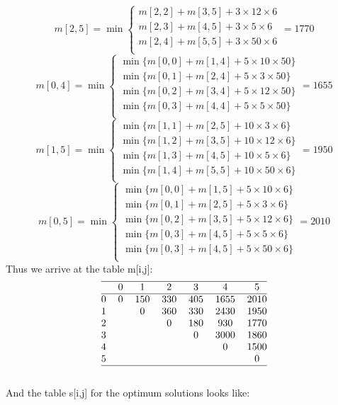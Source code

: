 \documentclass[10pt]{article}
\begin{document}
\[
m[2,5]=\min
\begin{cases}
m[2,2] + m[3,5] + 3\times12\times6\\
m[2,3] + m[4,5] + 3\times5\times6\\
m[2,4] + m[5,5] + 3\times50\times6\\
\end{cases}
=1770
\]
\[
m[0,4]=\min
\begin{cases}
\min\{m[0,0] + m[1,4] + 5\times10\times50\}\\
\min\{m[0,1] + m[2,4] + 5\times3\times50\}\\
\min\{m[0,2] + m[3,4] + 5\times12\times50\}\\
\min\{m[0,3] + m[4,4] + 5\times5\times50\}\\
\end{cases}
=1655
\]
\[
m[1,5]=\min
\begin{cases}
\min\{m[1,1] + m[2,5] + 10\times3\times6\}\\
\min\{m[1,2] + m[3,5] + 10\times12\times6\}\\
\min\{m[1,3] + m[4,5] + 10\times5\times6\}\\
\min\{m[1,4] + m[5,5] + 10\times50\times6\}\\
\end{cases}
=1950
\]
\[
m[0,5]=\min
\begin{cases}
\min\{m[0,0] + m[1,5] + 5\times10\times6\}\\
\min\{m[0,1] + m[2,5] + 5\times3\times6\}\\
\min\{m[0,2] + m[3,5] + 5\times12\times6\}\\
\min\{m[0,3] + m[4,5] + 5\times5\times6\}\\
\min\{m[0,3] + m[4,5] + 5\times50\times6\}\\
\end{cases}
=2010
\]
Thus we arrive at the table m[i,j]:\\
$$\begin{tabular}{@{} ccccccc @{}}
\hline
&0&1&2&3&4&5\\
\hline
0&0&150&330&405&1655&2010\\
1&&0&360&330&2430&1950\\
2&&&0&180&930&1770\\
3&&&&0&3000&1860\\
4&&&&&0&1500\\
5&&&&&&0\\
\hline
\end{tabular}$$\\
And the table s[i,j] for the optimum solutions looks like:
\end{document}
